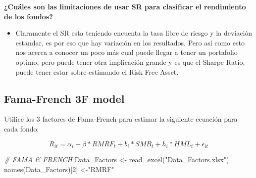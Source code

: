 \documentclass[
  12pt,
]{article}
\newenvironment{Shaded}{\begin{snugshade}}{\end{snugshade}}
\newcommand{\CommentTok}[1]{\textcolor[rgb]{0.56,0.35,0.01}{\textit{#1}}}
\newcommand{\ControlFlowTok}[1]{\textcolor[rgb]{0.13,0.29,0.53}{\textbf{#1}}}
\newcommand{\DecValTok}[1]{\textcolor[rgb]{0.00,0.00,0.81}{#1}}
\newcommand{\FunctionTok}[1]{\textcolor[rgb]{0.00,0.00,0.00}{#1}}
\newcommand{\NormalTok}[1]{#1}
\newcommand{\OtherTok}[1]{\textcolor[rgb]{0.56,0.35,0.01}{#1}}
\newcommand{\SpecialCharTok}[1]{\textcolor[rgb]{0.00,0.00,0.00}{#1}}
\newcommand{\StringTok}[1]{\textcolor[rgb]{0.31,0.60,0.02}{#1}}
\providecommand{\tightlist}{%
  \setlength{\itemsep}{0pt}\setlength{\parskip}{0pt}}
\begin{document}
\textbf{¿Cuáles son las limitaciones de usar SR para clasificar el
rendimiento de los fondos?}

\begin{itemize}
\tightlist
\item
  Claramente el SR esta teniendo encuenta la tasa libre de riesgo y la
  deviación estandar, es por eso que hay variación en los resultados.
  Pero así como esto nos acerca a conocer un poco más cual puede llegar
  a tener un portafolio optimo, pero puede tener otra implicación grande
  y es que el Sharpe Ratio, puede tener estar sobre estimando el Risk
  Free Asset.
\end{itemize}

\hypertarget{fama-french-3f-model}{%
\subsection{Fama-French 3F model}\label{fama-french-3f-model}}

Utilice los 3 factores de Fama-French para estimar la siguiente ecuación
para cada fondo:

\[
R_{it}=\alpha_i+\beta \ast RMRF_t +b_i \ast SMB_t +h_i \ast HML_t + \epsilon_{it}
\]

\begin{Shaded}
\begin{Highlighting}[]
\CommentTok{\# FAMA \& FRENCH}
\NormalTok{Data\_Factors }\OtherTok{\textless{}{-}} \FunctionTok{read\_excel}\NormalTok{(}\StringTok{"Data\_Factors.xlsx"}\NormalTok{)}
\FunctionTok{names}\NormalTok{(Data\_Factors)[}\DecValTok{2}\NormalTok{] }\OtherTok{\textless{}{-}}\StringTok{"RMRF"}
\end{Highlighting}
\end{Shaded}

\begin{Shaded}
\end{Shaded}
\end{document}
